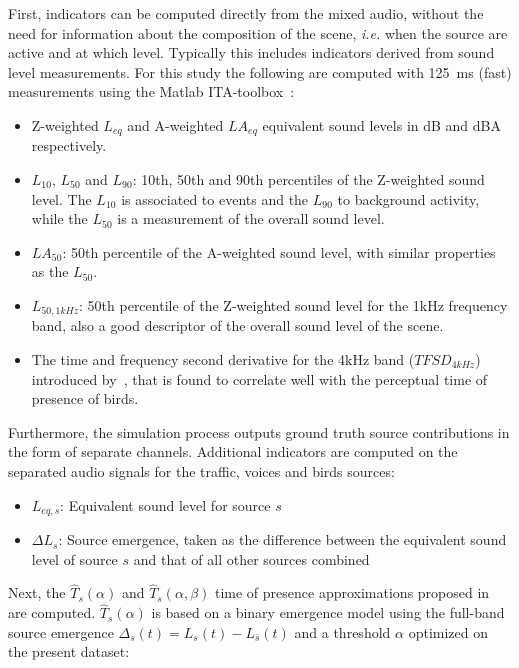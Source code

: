 \documentclass[11pt,a4paper]{article}
\begin{document}
First, indicators can be computed directly from the mixed audio, without the need for information about the composition of the scene, \textit{i.e.} when the source are active and at which level. Typically this includes indicators derived from sound level measurements. For this study the following are computed with 125~ms (fast) measurements using the Matlab ITA-toolbox~\cite{itatoolbox2017}:

\begin{itemize}
\item Z-weighted $L_{eq}$ and A-weighted $LA_{eq}$ equivalent sound levels in dB and dBA respectively.
\item $L_{10}$, $L_{50}$ and $L_{90}$: 10th, 50th and 90th percentiles of the Z-weighted sound level. The $L_{10}$ is associated to events and the $L_{90}$ to background activity, while the $L_{50}$ is a measurement of the overall sound level.
\item $LA_{50}$: 50th percentile of the A-weighted sound level, with similar properties as the $L_{50}$.
\item $L_{50, 1kHz}$: 50th percentile of the Z-weighted sound level for the 1kHz frequency band, also a good descriptor of the overall sound level of the scene.
\item The time and frequency second derivative for the 4kHz band ($TFSD_{4kHz}$) introduced by~\cite{aumond2017}, that is found to correlate well with the perceptual time of presence of birds.
\end{itemize}

Furthermore, the simulation process outputs ground truth source contributions in the form of separate channels. Additional indicators are computed on the separated audio signals for the traffic, voices and birds sources:

\begin{itemize}
\item $L_{eq, s}$: Equivalent sound level for source $s$
\item $\Delta L_{s}$: Source emergence, taken as the difference between the equivalent sound level of source $s$ and that of all other sources combined
\end{itemize}

Next, the $\hat T_s(\alpha)$ and $\hat T_s(\alpha, \beta)$ time of presence approximations proposed in~\cite{gontier2018} are computed. $\hat T_s(\alpha)$ is based on a binary emergence model using the full-band source emergence $\Delta_s(t) = L_s(t) - L_{\bar{s}}(t)$ and a threshold $\alpha$ optimized on the present dataset:
\end{document}

